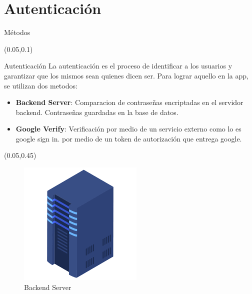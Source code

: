 \documentclass[xcolor=pdftex,dvipsnames,table]{beamer}
\begin{document}
\section{Autenticación}
\begin{frame}{Métodos}
\small{

    \begin{textblock*}{0.9\textwidth}(0.05\textwidth,0.1\textwidth)
        \begin{block}{Autenticación} 
            La autenticación es el proceso de identificar a los usuarios y garantizar que los mismos sean quienes dicen ser. Para lograr aquello en la app, se utilizan dos metodos:
                    \small {
                    \begin{itemize}
                      \setlength\itemsep{0.1em}
                        \item {\textbf{Backend Server}: Comparacion de contraseñas encriptadas en el servidor backend. Contraseñas guardadas en la base de datos. }
                        \item {\textbf{Google Verify}: Verificación por medio de un servicio externo como lo es google sign in. por medio de un token de autorización que entrega google.}
                    \end{itemize}}
            
        \end{block}
    \end{textblock*}
    
    \begin{textblock*}{0.45\textwidth}(0.05\textwidth,0.45\textwidth)
        \begin{figure}
            \centering
            \includegraphics[width=0.45\linewidth]{auth/serverlkogo.png}
            \caption*{Backend Server}
            \label{fig:my_label}
        \end{figure}
    \end{textblock*}
    
}
\end{frame}
\end{document}
